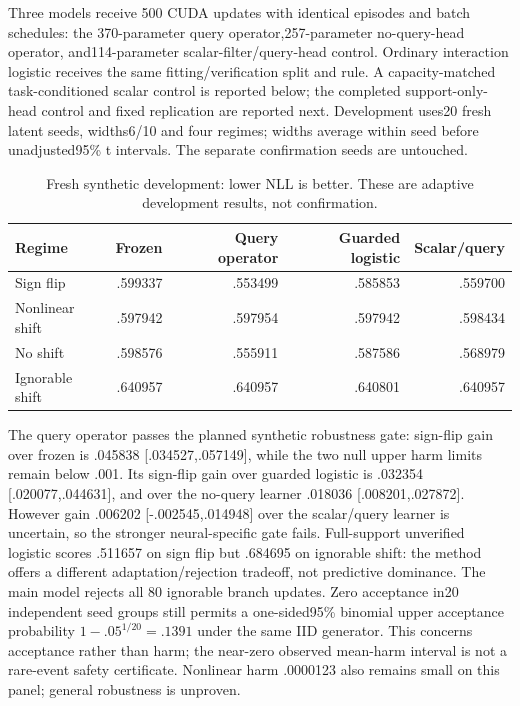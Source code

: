 \documentclass[10pt]{article}
\begin{document}
Three models receive 500 CUDA updates with identical episodes and batch schedules: the 370-parameter query operator,257-parameter no-query-head operator, and114-parameter scalar-filter/query-head control. Ordinary interaction logistic receives the same fitting/verification split and rule. A capacity-matched task-conditioned scalar control is reported below; the completed support-only-head control and fixed replication are reported next. Development uses20 fresh latent seeds, widths6/10 and four regimes; widths average within seed before unadjusted95\% t intervals. The separate confirmation seeds are untouched.

\begin{table}[t]
\centering\small
\caption{Fresh synthetic development: lower NLL is better. These are adaptive development results, not confirmation.}
\begin{tabular}{lrrrr}
\toprule
Regime & Frozen & Query operator & Guarded logistic & Scalar/query\\
\midrule
Sign flip & .599337 & .553499 & .585853 & .559700\\
Nonlinear shift & .597942 & .597954 & .597942 & .598434\\
No shift & .598576 & .555911 & .587586 & .568979\\
Ignorable shift & .640957 & .640957 & .640801 & .640957\\
\bottomrule
\end{tabular}
\end{table}

The query operator passes the planned synthetic robustness gate: sign-flip gain over frozen is .045838 [.034527,.057149], while the two null upper harm limits remain below .001. Its sign-flip gain over guarded logistic is .032354 [.020077,.044631], and over the no-query learner .018036 [.008201,.027872]. However gain .006202 [-.002545,.014948] over the scalar/query learner is uncertain, so the stronger neural-specific gate fails. Full-support unverified logistic scores .511657 on sign flip but .684695 on ignorable shift: the method offers a different adaptation/rejection tradeoff, not predictive dominance. The main model rejects all 80 ignorable branch updates. Zero acceptance in20 independent seed groups still permits a one-sided95\% binomial upper acceptance probability $1-.05^{1/20}=.1391$ under the same IID generator. This concerns acceptance rather than harm; the near-zero observed mean-harm interval is not a rare-event safety certificate. Nonlinear harm .0000123 also remains small on this panel; general robustness is unproven.
\end{document}
